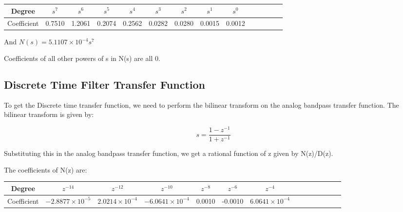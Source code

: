 \documentclass{article}
\begin{document}
\vspace{-10mm}

\begin{table}[H]
		\begin{center}
		\begin{tabular}{|c|c|c|c|c|c|c|c|c|c|c|c|c|c|}
			\hline
			Degree &  $s^7$ & $s^6$  & $s^5$ & $s^4$ & $s^3$ & $s^2$ & $s^1$ & $s^0$ \\
			
			\hline
                Coefficient  & 0.7510 & 1.2061 & 0.2074 & 0.2562 & 0.0282 & 0.0280 & 0.0015 & 0.0012 \\
                \hline
            
		\end{tabular}
		\end{center}
\end{table}

And $N(s) = 5.1107 \times 10^{-4} s^7$



Coefficients of all other powers of s in N(s) are all 0.


\subsection{Discrete Time Filter Transfer Function}

To get the Discrete time transfer function, we need to perform the bilinear transform on the analog  bandpass transfer function.
The bilinear transform is given by:
\vspace{-5mm}
\begin{center}
    \begin{equation*}
        s = \frac{1-z^{-1}}{1+z^{-1}}
    \end{equation*}
\end{center}

Substituting this in the analog bandpass transfer function, we get a rational function of z given by N(z)/D(z).

The coefficients of N(z) are:


\begin{table}[H]
		\begin{center}
		\begin{tabular}{|c|c|c|c|c|c|c|c|c|c|c|c|c|c|}
			\hline
			Degree  & $z^{-14}$ & $z^{-12}$ & $z^{-10}$ & $z^{-8}$ & $z^{-6}$  & $z^{-4}$  \\
			
			\hline
                Coefficient  & $-2.8877 \times 10^{-5}$ & $2.0214 \times 10^{-4}$ & $-6.0641 \times 10^{-4}$ & 0.0010 & -0.0010 & $6.0641 \times 10^{-4}$ \\
                \hline
            
		\end{tabular}
		\end{center}
\end{table}
\end{document}
